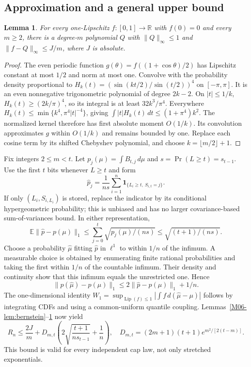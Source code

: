 \documentclass[11pt,a4paper]{article}
\newtheorem{lemma}[theorem]{Lemma}
\theoremstyle{definition}\newtheorem{definition}[theorem]{Definition}
\theoremstyle{remark}\newtheorem{remark}[theorem]{Remark}
\newcommand{\R}{\mathbb R}\newcommand{\C}{\mathbb C}\newcommand{\N}{\mathbb N}
\newcommand{\E}{\mathbb E}\newcommand{\one}{\mathbf 1}\newcommand{\1}{\mathbf 1}
\DeclareMathOperator{\Lip}{Lip}\DeclareMathOperator{\Var}{Var}
\numberwithin{equation}{section}
\begin{document}
\subsection{Approximation and a general upper bound}\label{M06-sec-3}
\begin{lemma}\label{M06-lem:approx}
For every one-Lipschitz $f:[0,1]\to\R$ with $f(0)=0$ and every $m\ge2$, there is a degree-$m$ polynomial $Q$ with $\|Q\|_\infty\le1$ and $\|f-Q\|_\infty\le J/m$, where $J$ is absolute.
\end{lemma}
\begin{proof}
The even periodic function $g(\theta)=f((1+\cos\theta)/2)$ has Lipschitz constant at most $1/2$ and norm at most one. Convolve with the probability density proportional to
$H_k(t)=(\sin(kt/2)/\sin(t/2))^4$ on $[-\pi,\pi]$.
It is an even nonnegative trigonometric polynomial of degree $2k-2$. On $|t|\le1/k$, $H_k(t)\ge(2k/\pi)^4$, so its integral is at least $32k^3/\pi^4$. Everywhere $H_k(t)\le\min\{k^4,\pi^4|t|^{-4}\}$, giving $\int|t|H_k(t)\,dt\le(1+\pi^4)k^2$. The normalized kernel therefore has first absolute moment $O(1/k)$. Its convolution approximates $g$ within $O(1/k)$ and remains bounded by one. Replace each cosine term by its shifted Chebyshev polynomial, and choose $k=\lfloor m/2\rfloor+1$.
\end{proof}

Fix integers $2\le m<t$. Let $p_j(\mu)=\int B_{t,j}\,d\mu$ and $s=\Pr(L\ge t)=s_{t-1}$. Use the first $t$ bits whenever $L\ge t$ and form
\[
 \widehat p_j=\frac1{ns}\sum_{i=1}^n\1_{\{L_i\ge t,\ S_{i,t}=j\}}.
\]
If only $(L_i,S_{i,L_i})$ is stored, replace the indicator by its conditional hypergeometric probability; this is unbiased and has no larger covariance-based sum-of-variances bound. In either representation,
\[
 \E\|\widehat p-p(\mu)\|_1
 \le\sum_{j=0}^t\sqrt{p_j(\mu)/(ns)}
 \le\sqrt{(t+1)/(ns)}.\tag{M06.4}
\]
Choose a probability $\widehat\mu$ fitting $\widehat p$ in $\ell^1$ to within $1/n$ of the infimum. A measurable choice is obtained by enumerating finite rational probabilities and taking the first within $1/n$ of the countable infimum. Their density and continuity show that this infimum equals the unrestricted one. Hence
\[
 \|p(\widehat\mu)-p(\mu)\|_1
 \le2\|\widehat p-p(\mu)\|_1+1/n.
\]
The one-dimensional identity $W_1=\sup_{\Lip(f)\le1}|\int f\,d(\widehat\mu-\mu)|$ follows by integrating CDFs and using a common-uniform quantile coupling. Lemmas~\ref{M06-lem:bernstein}--\ref{M06-lem:approx} now yield
\[
 R_n\le\frac{2J}{m}+D_{m,t}\left(2\sqrt{\frac{t+1}{ns_{t-1}}}+\frac1n\right),
 \quad D_{m,t}=(2m+1)(t+1)e^{m^2/[2(t-m)]}.\tag{M06.5}
\]
This bound is valid for every independent cap law, not only stretched exponentials.
\end{document}
